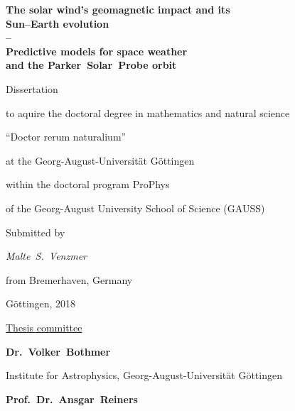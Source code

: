 
\begin{titlepage}
	\begin{center}
		\vspace*{\fill}
		{\LARGE\sffamily
			\textbf{The solar wind's geomagnetic impact and its\\Sun--Earth evolution\\--\\Predictive models for space weather\\and the Parker~Solar~Probe orbit}\\
		}
		\renewcommand{\baselinestretch}{1.5}

		\vspace{3\baselineskip}
		\Large\rmfamily
		Dissertation
		
		to aquire the doctoral degree in mathematics and natural science	%
		
		``Doctor rerum naturalium''
		
		at the Georg-August-Universität Göttingen
		
		\vspace{\baselineskip}
		within the doctoral program ProPhys
		
		of the Georg-August University School of Science (GAUSS)
		
		\vspace{3\baselineskip}
		Submitted by
		
		\textit{%
			Malte~S.~Venzmer
		}
		
		from Bremerhaven, Germany
		
		\vspace{3\baselineskip}
		Göttingen, 2018
		\vspace{\fill}
	\end{center}
\end{titlepage}

\newpage

\vspace*{\fill}

\noindent \underline{Thesis committee}
\vspace{\baselineskip}

\textbf{Dr.~Volker~Bothmer}

Institute for Astrophysics, Georg-August-Universität Göttingen
\vspace{\baselineskip}

\textbf{Prof.~Dr.~Ansgar~Reiners}

